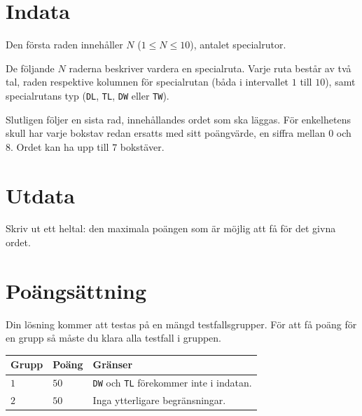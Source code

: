 \section*{Indata}
Den första raden innehåller $N$ ($1\leq N \leq 10$), antalet specialrutor.

De följande $N$ raderna beskriver vardera en specialruta. Varje ruta består av två tal, raden respektive
kolumnen för specialrutan (båda i intervallet $1$ till $10$), samt specialrutans typ (\texttt{DL}, \texttt{TL}, \texttt{DW} eller \texttt{TW}).

Slutligen följer en sista rad, innehållandes ordet som ska läggas. För enkelhetens skull har varje bokstav redan ersatts med sitt poängvärde, en siffra mellan $0$ och $8$. Ordet kan ha upp till $7$ bokstäver.

\section*{Utdata}
Skriv ut ett heltal: den maximala poängen som är möjlig att få för det givna ordet.

\section*{Poängsättning}
Din lösning kommer att testas på en mängd testfallsgrupper.
För att få poäng för en grupp så måste du klara alla testfall i gruppen.

\noindent
\begin{tabular}{| l | l | p{12cm} |}
  \hline
  \textbf{Grupp} & \textbf{Poäng} & \textbf{Gränser} \\ \hline
  $1$    & $50$          & \texttt{DW} och \texttt{TL} förekommer inte i indatan.  \\ \hline
  $2$    & $50$          & Inga ytterligare begränsningar.  \\ \hline
\end{tabular}
